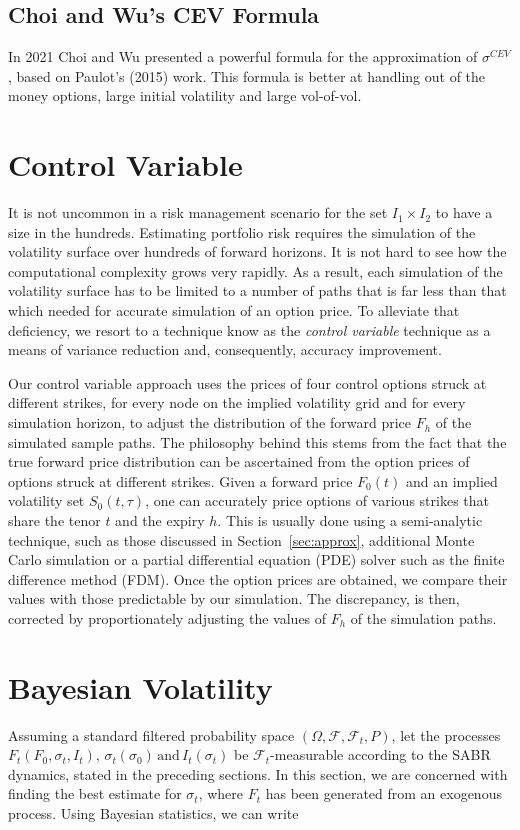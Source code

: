 \documentclass[12pt,oneside]{article}
\numberwithin{equation}{section}
\begin{document}
\subsection{Choi and Wu's CEV Formula}
In 2021 Choi and Wu\cite{CW} presented a powerful formula for the
approximation of $\sigma^{CEV}$, based on
Paulot's (2015) work\cite{P}.
This formula is better at handling out of the money options,
large initial volatility and large vol-of-vol.

\section{Control Variable}
It is not uncommon in a risk management scenario for the set $I_1\times I_2$
to have a size in the hundreds.
Estimating portfolio risk requires the simulation of the volatility surface over
hundreds of forward horizons.
It is not hard to see how the computational complexity grows very rapidly.
As a result, each simulation of the volatility surface has to be
limited to a number of paths that is far less than that which
needed for accurate simulation of an option price.
To alleviate that deficiency, we resort to a technique know as the
{\em control variable} technique as a means of variance reduction and,
consequently, accuracy improvement.

Our control variable approach uses the prices of four control options
struck at different strikes, for every node on the implied volatility
grid and for every simulation horizon, to adjust the distribution
of the forward price $F_h$ of the simulated sample paths.
The philosophy behind this stems from the fact that the
true forward price distribution can be ascertained from 
the option prices of options struck at different strikes.
Given a forward price $F_0(t)$ and an implied volatility
set $S_0(t,\tau)$, one can accurately price options of various strikes
that share the tenor $t$ and the expiry $h$.
This is usually done using a semi-analytic technique, such as those
discussed in Section~\ref{sec:approx},
additional Monte Carlo simulation or a partial differential equation (PDE)
solver such as the finite difference method (FDM).
Once the option prices are obtained, we compare their values
with those predictable by our simulation.
The discrepancy, is then, corrected by proportionately
adjusting the values of $F_h$
of the simulation paths.


\section{Bayesian Volatility}
Assuming a standard filtered probability space $(\Omega, \mathcal{F}, \mathcal{F}_t, P)$,
let the processes $F_t(F_0,\sigma_t,I_t),\,\sigma_t(\sigma_0)\,\text{and}\,I_t(\sigma_t)$
be $\mathcal{F}_t$-measurable according to the SABR dynamics, stated in the preceding sections.
In this section, we are concerned with finding the best estimate for
$\sigma_t$, where $F_t$ has been generated from an exogenous process.
Using Bayesian statistics, we can write
\end{document}
